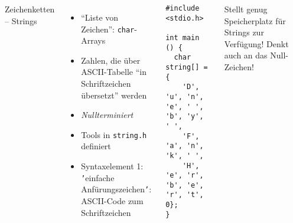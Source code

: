 \begin{frame}[fragile]
%
\begin{columns}[T]
\begin{Large}
{Zeichenketten -- Strings}
\vspace{6pt}
\end{Large}
\begin{itemize}
\item \enquote{Liste von Zeichen}: \texttt{char}-Arrays
\item Zahlen, die über ASCII-Tabelle \enquote{in Schriftzeichen übersetzt} werden
\item \emph{Nullterminiert}
\item Tools in \texttt{string.h} definiert
\item Syntaxelement 1: \texttt{'}einfache Anfürungszeichen\texttt{'}: ASCII-Code zum Schriftzeichen
\end{itemize}
%
\begin{codebox}
\begin{verbatim}
#include <stdio.h>

int main () {
  char string[] = {
    'D', 'u', 'n', 'e', ' ', 'b', 'y', ' ', 
    'F', 'a', 'n', 'k', ' ', 
    'H', 'e', 'r', 'b', 'e', 'r', 't', 0};
}
\end{verbatim}
\end{codebox}
%
\begin{warnbox}
Stellt genug Speicherplatz für Strings zur Verfügung!\newline
Denkt auch an das Null-Zeichen!
\end{warnbox}
%
\end{columns}
%
\end{frame}


